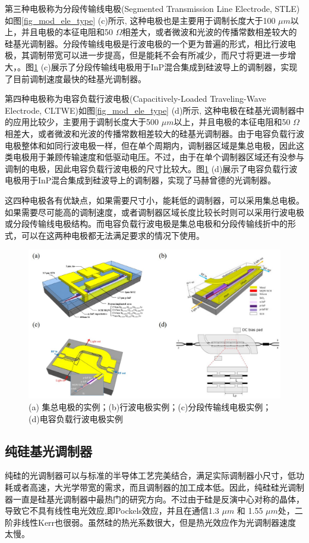 第三种电极称为分段传输线电极(Segmented Transmission Line Electrode, STLE)如图\ref{fig_mod_ele_type} (c)所示, 这种电极也是主要用于调制长度大于100 $\mu m$以上，并且电极的本征电阻和50 $\Omega$相差大，或者微波和光波的传播常数相差较大的硅基光调制器。分段传输线电极是行波电极的一个更为普遍的形式，相比行波电极，其调制带宽可以进一步提高，但是能耗不会有所减少，而尺寸将更进一步增大，。图\ref{fig_mod_ele_type_real} (c)展示了分段传输线电极用于InP混合集成到硅波导上的调制器\cite{tang2012energy}，实现了目前调制速度最快的硅基光调制器。

第四种电极称为电容负载行波电极(Capacitively-Loaded Traveling-Wave Electrode, CLTWE)如图\ref{fig_mod_ele_type} (d)所示, 这种电极在硅基光调制器中的应用比较少，主要用于调制长度大于500 $\mu m$以上，并且电极的本征电阻和50 $\Omega$相差大，或者微波和光波的传播常数相差较大的硅基光调制器。由于电容负载行波电极整体和如同行波电极一样，但在单个周期内，调制器区域是集总电极，因此这类电极用于兼顾传输速度和低驱动电压。不过，由于在单个调制器区域还有没参与调制的电极，因此电容负载行波电极的尺寸比较大。图\ref{fig_mod_ele_type_real} (d)展示了电容负载行波电极用于InP混合集成到硅波导上的调制器\cite{tang2012energy}，实现了马赫曾德的光调制器。

这四种电极各有优缺点，如果需要尺寸小，能耗低的调制器，可以采用集总电极。如果需要尽可能高的调制速度，或者调制器区域长度比较长时则可以采用行波电极或分段传输线电极结构。而电容负载行波电极是集总电极和分段传输线折中的形式，可以在这两种电极都无法满足要求的情况下使用。
\begin{figure}[htb]
	\centering
	\includegraphics[width=12cm]{./Pictures/fig_mod_ele_type_real.jpg}
	\caption{ (a) 集总电极的实例\cite{tang2012energy}；(b)行波电极实例\cite{tang201150}；(c)分段传输线电极实例\cite{tang2012over}；(d)电容负载行波电极实例\cite{chen2011forty}}
	\label{fig_mod_ele_type_real}
\end{figure}
\subsection{纯硅基光调制器} \label{pure_simodulator}
纯硅的光调制器可以与标准的半导体工艺完美结合，满足实际调制器小尺寸，低功耗或者高速，大光学带宽的需求，而且调制器的加工成本低。因此，纯硅硅光调制器一直是硅基光调制器中最热门的研究方向。不过由于硅是反演中心对称的晶体，导致它不具有线性电光效应,即Pockels效应，并且在通信1.3 $\mu m$ 和 1.55 $\mu m$处，二阶非线性Kerr也很弱\cite{soref1987electrooptical}。虽然硅的热光系数很大，但是热光效应作为光调制器速度太慢\cite{cocorullo1992thermo}。

